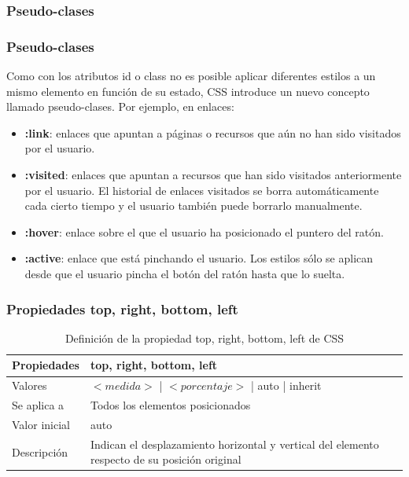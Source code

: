\subsubsection*{Pseudo-clases}

\begin{frame}
\frametitle{Pseudo-clases}

Como con los atributos id o class no es posible aplicar diferentes estilos a un mismo elemento en función de su estado, CSS introduce un nuevo concepto llamado pseudo-clases. Por ejemplo, en enlaces:

\begin{itemize}
  \item {\bf :link}: enlaces que apuntan a páginas o recursos que aún no han sido visitados por el usuario.
  \item {\bf :visited}: enlaces que apuntan a recursos que han sido visitados anteriormente por el usuario. El historial de enlaces visitados se borra automáticamente cada cierto tiempo y el usuario también puede borrarlo manualmente.
  \item {\bf :hover}: enlace sobre el que el usuario ha posicionado el puntero del ratón.
  \item {\bf :active}: enlace que está pinchando el usuario. Los estilos sólo se aplican desde que el usuario pincha el botón del ratón hasta que lo suelta.
\end{itemize}

\end{frame}




\begin{frame}
\frametitle{Propiedades top, right, bottom, left}

\begin{center}
  \begin{table}
   \begin{tabular}{p{1.8cm}p{7.8cm}}
Propiedades& {\bf top}, {\bf right}, {\bf bottom}, {\bf left} \\ \hline
Valores& $<medida>$ | $<porcentaje>$ | auto | inherit \\ \hline
Se aplica a& Todos los elementos posicionados \\ \hline
Valor inicial& auto \\ \hline
Descripción& Indican el desplazamiento horizontal y vertical del elemento respecto de su posición original \\ \hline
  \end{tabular}
   \caption{Definición de la propiedad top, right, bottom, left de CSS}
 \end{table}
\end{center}


\end{frame}


